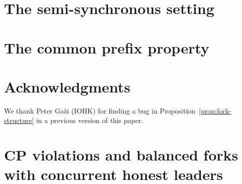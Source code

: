 \documentclass{article}
\theoremstyle{definition}
\begin{document}
\section{The semi-synchronous setting}\label{sec:async}\label{sec:async-model}



\section{The common prefix property}\label{sec:cp}\label{sec:cp-model}



\section*{Acknowledgments}
We thank Peter Ga\v{z}i (IOHK) for finding a bug in Proposition~\ref{prop:fork-structure} in a previous version of this paper. 




\appendix


% 


\break
\newpage
\section{CP violations and balanced forks with concurrent honest leaders}
\label{sec:cp-forks}






% 




% 
\end{document}
